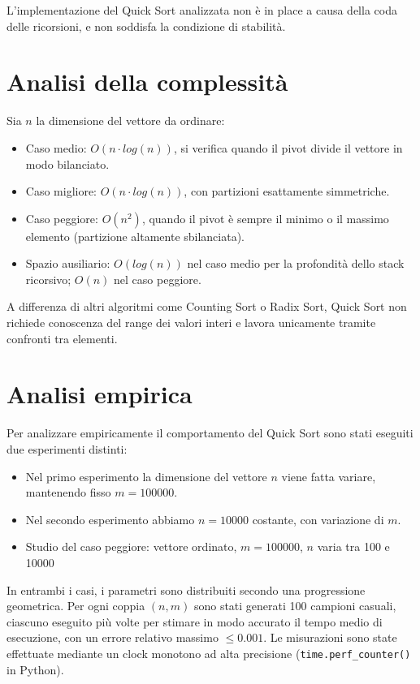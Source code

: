 \documentclass[a4paper, 12pt, oneside]{book}
\begin{document}
\noindent
L'implementazione del Quick Sort analizzata non è in place a causa della coda delle ricorsioni, e non soddisfa la condizione di stabilità.

\section{Analisi della complessità}

Sia \(n\) la dimensione del vettore da ordinare:

\begin{itemize}
    \item Caso medio: \(O(n \cdot log(n))\), si verifica quando il pivot divide il vettore in modo bilanciato.
    \item Caso migliore: \(O(n \cdot log(n))\), con partizioni esattamente simmetriche.
    \item Caso peggiore: \(O(n^2)\), quando il pivot è sempre il minimo o il massimo elemento (partizione altamente sbilanciata).
    \item Spazio ausiliario: \(O(log(n))\) nel caso medio per la profondità dello stack ricorsivo; \(O(n)\) nel caso peggiore.
\end{itemize}

\noindent A differenza di altri algoritmi come Counting Sort o Radix Sort, Quick Sort non richiede conoscenza del range dei valori interi e lavora unicamente tramite confronti tra elementi.

\section{Analisi empirica}

Per analizzare empiricamente il comportamento del Quick Sort sono stati eseguiti due esperimenti distinti:

\begin{itemize}
    \item Nel primo esperimento la dimensione del vettore \(n\) viene fatta variare, mantenendo fisso \(m = 100000\).
    \item Nel secondo esperimento abbiamo \(n = 10000\) costante, con variazione di \(m\).
    \item Studio del caso peggiore: vettore ordinato, \(m = 100000\), \(n\) varia tra 100 e 10000
\end{itemize}

\noindent In entrambi i casi, i parametri sono distribuiti secondo una progressione geometrica.
Per ogni coppia \((n, m)\) sono stati generati 100 campioni casuali, ciascuno eseguito più volte per stimare in modo accurato il tempo medio di esecuzione, con un errore relativo massimo \(\leq 0.001\).
Le misurazioni sono state effettuate mediante un clock monotono ad alta precisione (\texttt{time.perf\_counter()} in Python). \\
\end{document}
